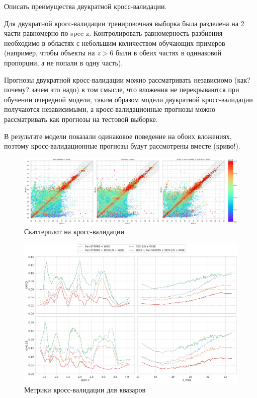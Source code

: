 \documentclass[fleqn,usenatbib]{mnras}
\begin{document}
Описать преимущества двукратной кросс-валидации.

Для двукратной кросс-валидации тренировочная выборка была разделена на 2 части равномерно по spec-z. Контролировать равномерность разбиения необходимо в областях с небольшим количеством обучающих примеров (например, чтобы объекты на $z > 6$ были в обеих частях в одинаковой пропорции, а не попали в одну часть).

Прогнозы двукратной кросс-валидации можно рассматривать независиомо (как? почему? зачем это надо) в том смысле, что вложения не перекрываются при обучении очередной модели, таким образом модели двукратной кросс-валидации получаются независимыми, а кросс-валидационные прогнозы можно рассматривать как прогнозы на тестовой выборке.

В результате модели показали одинаковое поведение на обоих вложениях, поэтому кросс-валидационные прогнозы будут рассмотрены вместе (криво!).

\begin{figure}
    \centering
    \includegraphics[width=0.9\linewidth]{images/scatterplots-cv2-total.png}
    \caption{Скаттерплот на кросс-валидации}
    \label{fig:my_label}
\end{figure}

\begin{figure}
    \centering
    \includegraphics[width=0.9\linewidth]{images/metrics-cv2-qso.png}
    \caption{Метрики кросс-валидации для квазаров}
    \label{fig:metrics-cv2-qso}
\end{figure}
\end{document}
